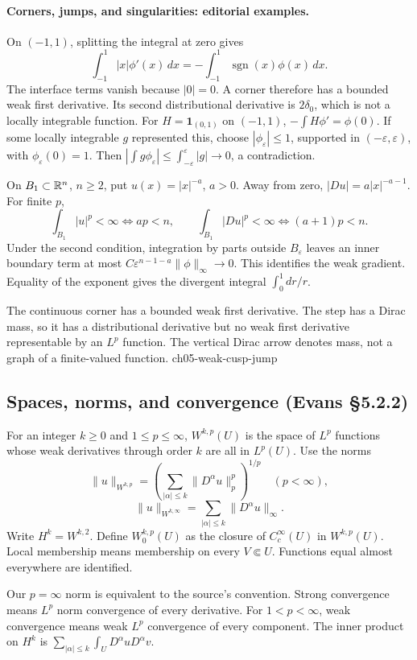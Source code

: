 \paragraph{Corners, jumps, and singularities: editorial examples.}
On $(-1,1)$, splitting the integral at zero gives
\[
 \int_{-1}^1|x|\phi'(x)\,dx
 =-\int_{-1}^1\operatorname{sgn}(x)\phi(x)\,dx.
\]
The interface terms vanish because $|0|=0$. A corner therefore has a
bounded weak first derivative. Its second distributional derivative is
$2\delta_0$, which is not a locally integrable function.
\Needspace{45mm}
For $H=\mathbf1_{(0,1)}$ on $(-1,1)$,
$-\int H\phi'=\phi(0)$. If some locally integrable $g$ represented this,
choose $|\phi_\varepsilon|\leq1$, supported in
$(-\varepsilon,\varepsilon)$, with $\phi_\varepsilon(0)=1$. Then
$|\int g\phi_\varepsilon|\leq
\int_{-\varepsilon}^{\varepsilon}|g|\to0$, a contradiction.

On $B_1\subset\mathbb{R}^n$, $n\geq2$, put $u(x)=|x|^{-a}$, $a>0$.
Away from zero, $|Du|=a|x|^{-a-1}$. For finite $p$,
\[
 \int_{B_1}|u|^p<\infty\iff ap<n,\qquad
 \int_{B_1}|Du|^p<\infty\iff (a+1)p<n.
\]
Under the second condition, integration by parts outside $B_\varepsilon$
leaves an inner boundary term at most
$C\varepsilon^{n-1-a}\|\phi\|_\infty\to0$. This identifies the weak
gradient. Equality of the exponent gives the divergent integral
$\int_0^1dr/r$.


{The continuous corner has a bounded weak first derivative. The step has a Dirac mass, so it has a distributional derivative but no weak first derivative representable by an $L^p$ function. The vertical Dirac arrow denotes mass, not a graph of a finite-valued function.}
{ch05-weak-cusp-jump}

\subsection{Spaces, norms, and convergence (Evans \S5.2.2)}
\begin{definition}
For an integer $k\geq0$ and $1\leq p\leq\infty$, $W^{k,p}(U)$ is the
space of $L^p$ functions whose weak derivatives through order $k$ are
all in $L^p(U)$. Use the norms
\[
 \|u\|_{W^{k,p}}=
 \left(\sum_{|\alpha|\leq k}\|D^\alpha u\|_p^p\right)^{1/p}
 \quad(p<\infty),
\]
\[
 \|u\|_{W^{k,\infty}}=\sum_{|\alpha|\leq k}\|D^\alpha u\|_\infty.
\]
Write $H^k=W^{k,2}$. Define $W^{k,p}_0(U)$ as the closure of
$C_c^\infty(U)$ in $W^{k,p}(U)$. Local membership means membership on
every $V\Subset U$. Functions equal almost everywhere are identified.
\end{definition}
Our $p=\infty$ norm is equivalent to the source's convention.
Strong convergence means $L^p$ norm convergence of every derivative.
For $1<p<\infty$, weak convergence means weak $L^p$ convergence of
every component. The inner product on $H^k$ is
$\sum_{|\alpha|\leq k}\int_U D^\alpha uD^\alpha v$.
\Needspace{45mm}

